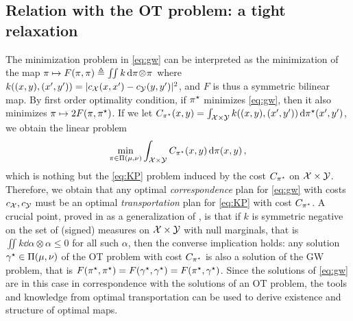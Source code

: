         \subsection{Relation with the OT problem: a tight relaxation}
        \label{subsec:intro_GW_and_OT}
        The minimization problem in \cref{eq:gw} can be interpreted as the minimization of the map $\pi \mapsto F(\pi,\pi) \triangleq \iint k \,\mathrm d \pi\! \otimes\! \pi$ where $k((x,y),(x',y')) = |c_{\mathcal{X}}(x,x') - c_{\mathcal{Y}}(y,y')|^2$, and $F$ is thus a symmetric bilinear map.
        By first order optimality condition, if $\pi^\star$ minimizes \cref{eq:gw}, then it also minimizes $\pi \mapsto 2 F(\pi, \pi^\star)$.
        If we let $C_{\pi^\star}(x,y) = \int_{\mathcal{X} \times \mathcal{Y}} k((x,y),(x',y')) \,\mathrm d \pi^\star(x', y')$, we obtain the linear problem
        \begin{equation}
            \min_{\pi \in \Pi(\mu,\nu)} \int_{\mathcal{X} \times \mathcal{Y}} C_{\pi^\star}(x,y) \,\mathrm d \pi(x,y)\,,
            \label{eq:linearized}
        \end{equation}
        which is nothing but the \cref{eq:KP} problem induced by the cost $C_{\pi^\star}$ on $\mathcal{X} \times \mathcal{Y}$.
        Therefore, we obtain that any optimal \emph{correspondence} plan for \cref{eq:gw} with costs $c_{\mathcal{X}}, c_{\mathcal{Y}}$ must be an optimal \emph{transportation} plan for \cref{eq:KP} with cost $C_{\pi^\star}$.
        A crucial point, proved in \cite[Thm.~3]{sejourne2021unbalanced} as a generalization of \cite{konno1976maximization}, is that if $k$ is symmetric negative on the set of (signed) measures on $\mathcal{X} \times \mathcal{Y}$ with null marginals, that is $\iint k \dd \alpha \otimes\alpha \leq 0$ for all such $\alpha$, then the converse implication holds: any solution $\gamma^\star \in \Pi(\mu,\nu)$ of the OT problem with cost $C_{\pi^\star}$ is also a solution of the GW problem, that is $F(\pi^\star,\pi^\star) = F(\gamma^\star,\gamma^\star) = F(\pi^\star,\gamma^\star)$.
        Since the solutions of \cref{eq:gw} are in this case in correspondence with the solutions of an OT problem, the tools and knowledge from optimal transportation can be used to derive existence and structure of optimal maps.


